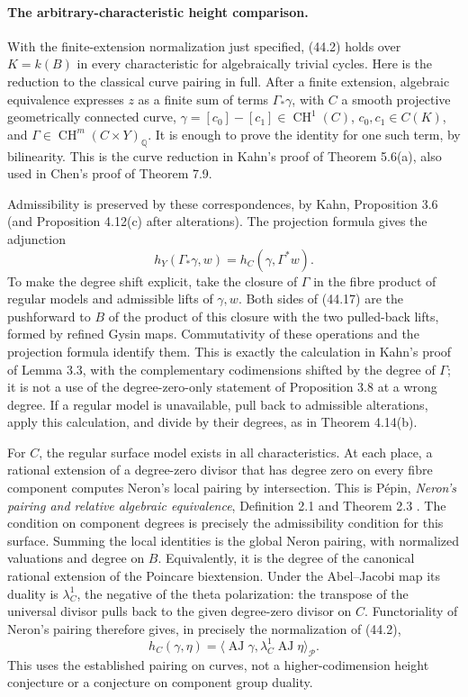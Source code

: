 \paragraph{The arbitrary-characteristic height comparison.}
With the finite-extension normalization just specified, (44.2)
holds over $K=k(B)$ in every characteristic for algebraically
trivial cycles.  Here is the reduction to the classical curve
pairing in full.  After a finite extension, algebraic equivalence
expresses $z$ as a finite sum of terms $\Gamma_*\gamma$, with
$C$ a smooth projective geometrically connected curve,
$\gamma=[c_0]-[c_1]\in\operatorname{CH}^1(C)$,
$c_0,c_1\in C(K)$, and
$\Gamma\in\operatorname{CH}^m(C\times Y)_{\mathbb Q}$.
It is enough to prove the identity for one such term, by
bilinearity.  This is the curve reduction in Kahn's proof of
Theorem 5.6(a), also used in Chen's proof of Theorem 7.9.

Admissibility is preserved by these correspondences, by Kahn,
Proposition 3.6 (and Proposition 4.12(c) after alterations).
The projection formula gives the adjunction
\[
 h_Y(\Gamma_*\gamma,w)=h_C(\gamma,\Gamma^*w).               \tag{44.17}
\]
To make the degree shift explicit, take the closure of $\Gamma$
in the fibre product of regular models and admissible lifts of
$\gamma,w$.  Both sides of (44.17) are the pushforward to $B$ of
the product of this closure with the two pulled-back lifts,
formed by refined Gysin maps.  Commutativity of these operations
and the projection formula identify them.  This is exactly the
calculation in Kahn's proof of Lemma 3.3, with the complementary
codimensions shifted by the degree of $\Gamma$; it is not a use
of the degree-zero-only statement of Proposition 3.8 at a wrong
degree.  If a regular model is unavailable, pull back to admissible
alterations, apply this calculation, and divide by their degrees,
as in Theorem 4.14(b).

For $C$, the regular surface model exists in all characteristics.
At each place, a rational extension of a degree-zero divisor that
has degree zero on every fibre component computes Neron's local
pairing by intersection.  This is P\'epin,
\emph{Neron's pairing and relative algebraic equivalence},
Definition 2.1 and Theorem 2.3 \cite{PepinNeron2011}.
The condition on component degrees is precisely the admissibility
condition for this surface.  Summing the local identities is the
global Neron pairing, with normalized valuations and degree on $B$.
Equivalently, it is the degree of the canonical rational extension
of the Poincare biextension.  Under the Abel--Jacobi map its
duality is $\lambda_C^1$, the negative of the theta polarization:
the transpose of the universal divisor pulls back to the given
degree-zero divisor on $C$.  Functoriality of Neron's pairing
therefore gives, in precisely the normalization of (44.2),
\[
 h_C(\gamma,\eta)
 =\langle\operatorname{AJ}\gamma,
                 \lambda_C^1\operatorname{AJ}\eta\rangle_{\mathcal P}.
                                                               \tag{44.18}
\]
This uses the established pairing on curves, not a
higher-codimension height conjecture or a conjecture on component
group duality.

